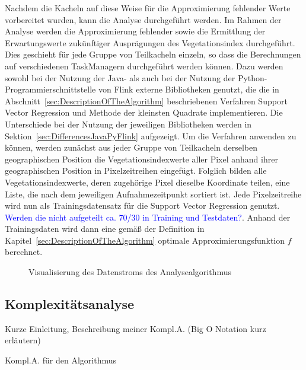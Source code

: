 Nachdem die Kacheln auf diese Weise für die Approximierung fehlender Werte vorbereitet wurden, kann die Analyse durchgeführt werden. Im Rahmen der Analyse werden die Approximierung fehlender sowie die Ermittlung der Erwartungswerte zukünftiger Ausprägungen des Vegetationsindex durchgeführt. Dies geschieht für jede Gruppe von Teilkacheln einzeln, so dass die Berechnungen auf verschiedenen TaskManagern durchgeführt werden können. Dazu werden sowohl bei der Nutzung der Java- als auch bei der Nutzung der Python-Programmierschnittstelle von Flink externe Bibliotheken genutzt, die die in Abschnitt~\ref{sec:DescriptionOfTheAlgorithm} beschriebenen Verfahren Support Vector Regression und Methode der kleinsten Quadrate implementieren. Die Unterschiede bei der Nutzung der jeweiligen Bibliotheken werden in Sektion~\ref{sec:DifferencesJavaPyFlink} aufgezeigt. Um die Verfahren anwenden zu können, werden zunächst aus jeder Gruppe von Teilkacheln derselben geographischen Position die Vegetationsindexwerte aller Pixel anhand ihrer geographischen Position in Pixelzeitreihen eingefügt. Folglich bilden alle Vegetationsindexwerte, deren zugehörige Pixel dieselbe Koordinate teilen, eine Liste, die nach dem jeweiligen Aufnahmezeitpunkt sortiert ist. Jede Pixelzeitreihe wird nun als Trainingsdatensatz für die Support Vector Regression genutzt. \textcolor{blue}{Werden die nicht aufgeteilt ca. 70/30 in Training und Testdaten?}. Anhand der Trainingsdaten wird dann eine gemäß der Definition in Kapitel~\ref{sec:DescriptionOfTheAlgorithm} optimale Approximierungsfunktion \(f \) berechnet. 

\begin{figure}
\centering

\caption{Visualisierung des Datenstroms des Analysealgorithmus} 
\label{fig:dataFlowAlgorithm}
\end{figure}


\subsection{Komplexitätsanalyse}
\label{sec:ComplexityAnalysis}
Kurze Einleitung, Beschreibung meiner Kompl.A. (Big O Notation kurz erläutern)

Kompl.A. für den Algorithmus

